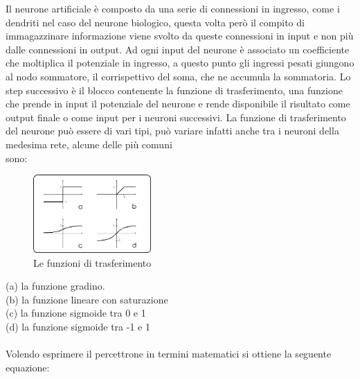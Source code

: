\documentclass[10pt,a4paper]{article}
\begin{document}
Il neurone artificiale è composto da una serie di connessioni in ingresso, come i dendriti nel caso del neurone biologico, questa volta però il compito di immagazzinare informazione viene svolto da queste connessioni in input e non più dalle connessioni in output. 
Ad ogni input del neurone è associato un coefficiente che moltiplica il potenziale in ingresso, a questo punto gli ingressi pesati giungono al nodo sommatore, il corrispettivo del soma, che ne accumula la sommatoria.
Lo step successivo è il blocco contenente la funzione di trasferimento, una funzione che prende in input il potenziale del neurone e rende disponibile il risultato come output finale o come input per i neuroni successivi.
La funzione di trasferimento del neurone può essere di vari tipi, può variare infatti anche tra i neuroni della medesima rete, alcune delle più comuni \\sono:
\begin{figure}
	\centering
	\vspace{-120pt}
    \includegraphics[width=0.4\textwidth]{FDTs.png}
  	\caption{Le funzioni di trasferimento}
  	\label{fig:graph4}
\end{figure}
(a) la funzione gradino. \\
(b) la funzione lineare con saturazione \\
(c) la funzione sigmoide tra 0 e 1 \\
(d) la funzione sigmoide tra -1 e 1 \\ \\
Volendo esprimere il percettrone in termini matematici si ottiene la seguente \\ equazione:
\end{document}
